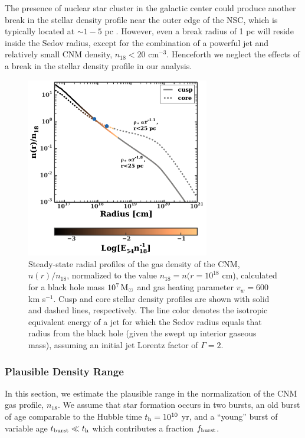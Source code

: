 \documentclass[usenatbib,fleqn]{mnras}
\newcommand{\Msun}{{\rm M_\odot}}
\begin{document}
The presence of nuclear star
cluster in the galactic center could produce another break in the
stellar density profile near the outer edge of the NSC, which is
typically located at $\sim 1-5$ pc \citep{Georgiev+2014}.  However,
even a break radius of 1 pc will reside inside the Sedov radius,
except for the combination of a powerful jet and relatively small CNM
density, $n_{18}<20$ cm$^{-3}$.  Henceforth we neglect the effects of
a break in the stellar density profile in our analysis.


\begin{figure}
\includegraphics[width=8cm]{sedov_radius.pdf}
\caption{\label{fig:profiles} Steady-state radial profiles of the gas
  density of the CNM, $n(r)/n_{18}$, normalized to the value $n_{18} =
  n(r = 10^{18}$ cm), calculated for a black hole mass $10^{7}
  \,\Msun$ and gas heating parameter $v_w=600$ km s$^{-1}$.  Cusp and
  core stellar density profiles are shown with solid and dashed lines,
  respectively.  The line color denotes the isotropic equivalent
  energy of a jet for which the Sedov radius equals that radius from
  the black hole (given the swept up interior gaseous mass), assuming
  an initial jet Lorentz factor of $\Gamma=2$.}
\end{figure}



\subsubsection{Plausible Density Range}
\label{sec:densAllowed}

In this section, we estimate the plausible range in the normalization
of the CNM gas profile, $n_{18}$.  We assume that star formation
occurs in two bursts, an old burst of age comparable to the Hubble
time $t_{\rm h} = 10^{10}$ yr, and a ``young'' burst of variable age
$t_{\rm burst} \ll t_{\rm h}$ which contributes a fraction $f_{\rm
  burst}$.
\end{document}
